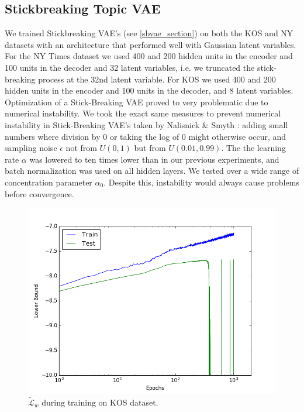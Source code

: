 \documentclass{report}
\begin{document}
		
	

		
		
		
	\subsection{Stickbreaking Topic VAE}\label{sbvae_exp}
	
	We trained Stickbreaking VAE's (see \ref{sbvae_section}) on both the KOS and NY datasets with an architecture that performed well with Gaussian latent variables. For the NY Times dataset we used 400 and  200 hidden units in the encoder and 100 units in the decoder and 32 latent variables, i.e. we truncated the stick-breaking process at the 32nd latent variable. For KOS we used 400 and 200 hidden units in the encoder and 100 units in the decoder, and 8 latent variables. Optimization of a Stick-Breaking VAE proved to very problematic due to numerical instability. We took the exact same measures to prevent numerical instability in Stick-Breaking VAE's taken by Nalisnick \& Smyth \cite{nalisnick2016deep}: adding small numbers where division by 0 or taking the log of 0 might otherwise occur, and sampling noise $\epsilon$ not from $U(0,1)$ but from $U(0.01, 0.99)$. The the learning rate $\alpha$ was lowered to ten times lower than in our previous experiments, and batch normalization was used on all hidden layers. We tested over a wide range of concentration parameter $\alpha_0$. Despite this, instability would always cause problems before convergence. 
	\begin{figure}
		\includegraphics[scale = 0.45]{img/lb_kos_sbvae.png}
		\caption{$\tilde{\mathcal{L}}_w$ during training on KOS dataset.}
		\label{lb_kos_sbvae}
	\end{figure}
\end{document}
